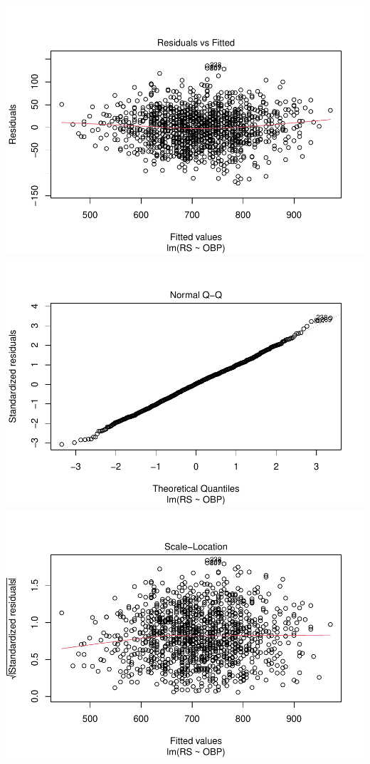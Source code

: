 \documentclass[
]{article}
\begin{document}
\includegraphics{HW2_Liu-Zi-Jian_files/figure-latex/unnamed-chunk-36-1.pdf}
\includegraphics{HW2_Liu-Zi-Jian_files/figure-latex/unnamed-chunk-36-2.pdf}
\includegraphics{HW2_Liu-Zi-Jian_files/figure-latex/unnamed-chunk-36-3.pdf}
\end{document}
